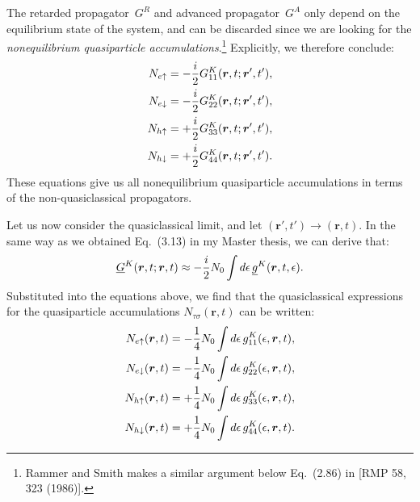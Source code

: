 The retarded propagator~$G^R$ and advanced propagator~$G^A$ only depend on the equilibrium state of the system, and can be discarded since we are looking for the \emph{nonequilibrium quasiparticle accumulations}.\footnote{Rammer and Smith makes a similar argument below Eq.~(2.86) in [RMP 58, 323 (1986)].}
Explicitly, we therefore conclude:\\[-3ex]
\begin{equation}
\begin{aligned}
  N_{e\uparrow} &= -\frac{i}{2} G^K_{11}(\bm{r}, t; \bm{r}', t'), \\
  N_{e\downarrow} &= -\frac{i}{2} G^K_{22}(\bm{r}, t; \bm{r}', t'), \\
  N_{h\uparrow} &= +\frac{i}{2} G^K_{33}(\bm{r}, t; \bm{r}', t'), \\
  N_{h\downarrow} &= +\frac{i}{2} G^K_{44}(\bm{r}, t; \bm{r}', t'). \\
\end{aligned}
\end{equation}
These equations give us all nonequilibrium quasiparticle accumulations in terms of the non-quasiclassical propagators.

Let us now consider the quasiclassical limit, and let $(\bm{r}',t') \rightarrow (\bm{r},t)$.
In the same way as we obtained Eq.~(3.13) in my Master thesis, we can derive that:
\begin{align}
  \underline{G}^K(\bm{r},t; \bm{r},t) \approx -\frac{i}{2} N_0 \int d\epsilon \, \underline{g}^K(\bm{r}, t, \epsilon).
\end{align}
Substituted into the equations above, we find that the quasiclassical expressions for the quasiparticle accumulations $N_{\tau\sigma}(\bm{r},t)$ can be written:
\begin{equation}
\begin{aligned}
  N_{e\uparrow}(\bm{r}, t) &= -\frac{1}{4} N_0 \int d\epsilon \, g^K_{11}(\epsilon, \bm{r}, t), \\
  N_{e\downarrow}(\bm{r}, t) &= -\frac{1}{4} N_0 \int d\epsilon \, g^K_{22}(\epsilon, \bm{r}, t), \\
  N_{h\uparrow}(\bm{r}, t) &= +\frac{1}{4} N_0 \int d\epsilon \, g^K_{33}(\epsilon, \bm{r}, t), \\
  N_{h\downarrow}(\bm{r}, t) &= +\frac{1}{4} N_0 \int d\epsilon \, g^K_{44}(\epsilon, \bm{r}, t). \\
\end{aligned}
\end{equation}

